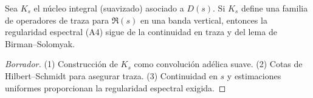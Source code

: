 \begin{lemma}
Sea $K_s$ el núcleo integral (suavizado) asociado a $D(s)$. Si $K_s$ define una familia
de operadores de traza para $\Re(s)$ en una banda vertical, entonces la regularidad
espectral (A4) sigue de la continuidad en traza y del lema de Birman--Solomyak.
\end{lemma}

\begin{proof}[Borrador]
(1) Construcción de $K_s$ como convolución adélica suave. (2) Cotas de Hilbert--Schmidt
para asegurar traza. (3) Continuidad en $s$ y estimaciones uniformes proporcionan la
regularidad espectral exigida.
\end{proof}

